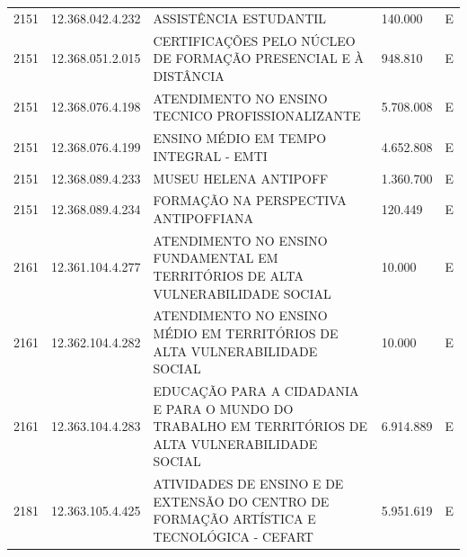 \documentclass{article}
\begin{document}
\begin{longtable}[c]{m{1cm}|m{2cm}|m{10cm}|m{2cm}|m{1cm}}
\multicolumn{1}{C{1cm}|}{2151} & \multicolumn{1}{C{2cm}|}{12.368.042.4.232} & \multicolumn{1}{L{10cm}|}{ASSISTÊNCIA ESTUDANTIL} & \multicolumn{1}{R{2cm}|}{140.000} & \multicolumn{1}{C{1cm}}{E} \\
\multicolumn{1}{C{1cm}|}{2151} & \multicolumn{1}{C{2cm}|}{12.368.051.2.015} & \multicolumn{1}{L{10cm}|}{CERTIFICAÇÕES PELO NÚCLEO DE FORMAÇÃO PRESENCIAL E À DISTÂNCIA} & \multicolumn{1}{R{2cm}|}{948.810} & \multicolumn{1}{C{1cm}}{E} \\
\multicolumn{1}{C{1cm}|}{2151} & \multicolumn{1}{C{2cm}|}{12.368.076.4.198} & \multicolumn{1}{L{10cm}|}{ATENDIMENTO NO ENSINO TECNICO PROFISSIONALIZANTE} & \multicolumn{1}{R{2cm}|}{5.708.008} & \multicolumn{1}{C{1cm}}{E} \\
\multicolumn{1}{C{1cm}|}{2151} & \multicolumn{1}{C{2cm}|}{12.368.076.4.199} & \multicolumn{1}{L{10cm}|}{ENSINO MÉDIO EM TEMPO INTEGRAL - EMTI} & \multicolumn{1}{R{2cm}|}{4.652.808} & \multicolumn{1}{C{1cm}}{E} \\
\multicolumn{1}{C{1cm}|}{2151} & \multicolumn{1}{C{2cm}|}{12.368.089.4.233} & \multicolumn{1}{L{10cm}|}{MUSEU HELENA ANTIPOFF} & \multicolumn{1}{R{2cm}|}{1.360.700} & \multicolumn{1}{C{1cm}}{E} \\
\multicolumn{1}{C{1cm}|}{2151} & \multicolumn{1}{C{2cm}|}{12.368.089.4.234} & \multicolumn{1}{L{10cm}|}{FORMAÇÃO NA PERSPECTIVA ANTIPOFFIANA} & \multicolumn{1}{R{2cm}|}{120.449} & \multicolumn{1}{C{1cm}}{E} \\
\multicolumn{1}{C{1cm}|}{2161} & \multicolumn{1}{C{2cm}|}{12.361.104.4.277} & \multicolumn{1}{L{10cm}|}{ATENDIMENTO NO ENSINO FUNDAMENTAL EM TERRITÓRIOS DE ALTA VULNERABILIDADE SOCIAL} & \multicolumn{1}{R{2cm}|}{10.000} & \multicolumn{1}{C{1cm}}{E} \\
\multicolumn{1}{C{1cm}|}{2161} & \multicolumn{1}{C{2cm}|}{12.362.104.4.282} & \multicolumn{1}{L{10cm}|}{ATENDIMENTO NO ENSINO MÉDIO EM TERRITÓRIOS DE ALTA VULNERABILIDADE SOCIAL} & \multicolumn{1}{R{2cm}|}{10.000} & \multicolumn{1}{C{1cm}}{E} \\
\multicolumn{1}{C{1cm}|}{2161} & \multicolumn{1}{C{2cm}|}{12.363.104.4.283} & \multicolumn{1}{L{10cm}|}{EDUCAÇÃO PARA A CIDADANIA E PARA O MUNDO DO TRABALHO EM TERRITÓRIOS DE ALTA VULNERABILIDADE SOCIAL} & \multicolumn{1}{R{2cm}|}{6.914.889} & \multicolumn{1}{C{1cm}}{E} \\
\multicolumn{1}{C{1cm}|}{2181} & \multicolumn{1}{C{2cm}|}{12.363.105.4.425} & \multicolumn{1}{L{10cm}|}{ATIVIDADES DE ENSINO E DE EXTENSÃO DO CENTRO DE FORMAÇÃO ARTÍSTICA E TECNOLÓGICA - CEFART} & \multicolumn{1}{R{2cm}|}{5.951.619} & \multicolumn{1}{C{1cm}}{E} \\

\end{longtable}
\end{document}
